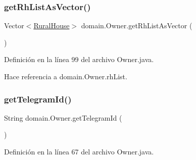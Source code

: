 \subsubsection{\texorpdfstring{getRhListAsVector()}{getRhListAsVector()}}
{\footnotesize\ttfamily Vector$<$\mbox{\hyperlink{classdomain_1_1_rural_house}{Rural\+House}}$>$ domain.\+Owner.\+get\+Rh\+List\+As\+Vector (\begin{DoxyParamCaption}{ }\end{DoxyParamCaption})}



Definición en la línea 99 del archivo Owner.\+java.


\begin{DoxyCode}{0}

\end{DoxyCode}


Hace referencia a domain.\+Owner.\+rh\+List.

\mbox{\label{classdomain_1_1_owner_a6aef327c7dde889395788d062a64f102}} 
\subsubsection{\texorpdfstring{getTelegramId()}{getTelegramId()}}
{\footnotesize\ttfamily String domain.\+Owner.\+get\+Telegram\+Id (\begin{DoxyParamCaption}{ }\end{DoxyParamCaption})}



Definición en la línea 67 del archivo Owner.\+java.


\begin{DoxyCode}{0}

\end{DoxyCode}


